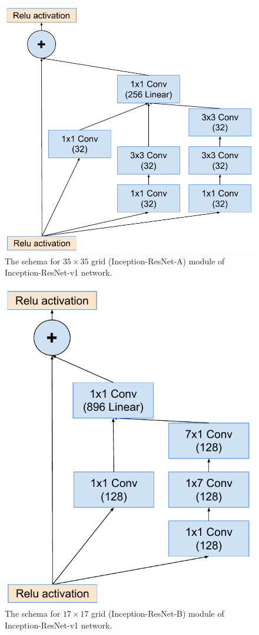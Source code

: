 \begin{figure}
\centering
\includegraphics[width=\linewidth]{resnetsmall35x35}
\caption{The schema for $35\times 35$ grid (Inception-ResNet-A) module of Inception-ResNet-v1
 network.}
\label{fig:resnetsmall35x35module}
\end{figure}
\begin{figure}
\centering
\includegraphics[width=\linewidth]{resnetsmall17x17}
\caption{The schema for $17\times 17$ grid (Inception-ResNet-B)  module of Inception-ResNet-v1
 network.}
\label{fig:resnetsmall17x17module}
\end{figure}
